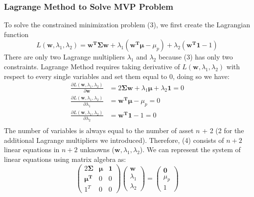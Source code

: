 \documentclass[12pt,titlepage,letter]{article}
\begin{document}
		\subsubsection{Lagrange Method to Solve MVP Problem}

			To solve the constrained minimization problem (3), we first create the Lagrangian function 
			$$
				L(\mathbf{w}, \lambda_1, \lambda_2) = \mathbf{w^T\Sigma w} + \lambda_1(\mathbf{w^T}\pmb{\mu} - \mu_p) + \lambda_2(\mathbf{w^T1} - 1)
			$$
			There are only two Lagrange multipliers $\lambda_1$ and $\lambda_2$ because (3) has only two constraints. Lagrange Method requires taking derivative of $L(\mathbf{w}, \lambda_1, \lambda_2)$ with respect to every single variables and set them equal to 0, doing so we have: 
			\begin{equation}
				\begin{split}
					\frac{\partial L(\mathbf{w}, \lambda_1, \lambda_2)}{\partial \mathbf{w}} &= 2\mathbf{\Sigma w} + \lambda_1\pmb{\mu} + \lambda_2\mathbf{1} = 0 \\
					\frac{\partial L(\mathbf{w}, \lambda_1, \lambda_2)}{\partial \lambda_1} &=  \mathbf{w^T}\pmb{\mu} - \mu_p = 0\\
					\frac{\partial L(\mathbf{w}, \lambda_1, \lambda_2)}{\partial \lambda_2} &= \mathbf{w^T1} - 1 = 0\\
				\end{split}
			\end{equation}
			The number of variables is always equal to the number of asset $n$ + 2 (2 for the additional Lagrange multipliers we introduced). Therefore, (4) consists of $n+2$ linear equations in $n+2$ unknowns ($\mathbf{w}, \lambda_1, \lambda_2$). We can represent the system of linear equations using matrix algebra as: 
			\begin{equation*}
				\begin{pmatrix} 
					2\mathbf{\Sigma} & \pmb{\mu} & \mathbf{1} \\ \mathbf{\mu^T} & 0 & 0 \\ 1^T & 0 & 0 
				\end{pmatrix} 
				\begin{pmatrix}
					\mathbf{w} \\ \lambda_1 \\ \lambda_2
				\end{pmatrix}
				 = 
				\begin{pmatrix}
					\mathbf{0} \\ \mu_p \\ 1
				\end{pmatrix}
			\end{equation*}
\end{document}
